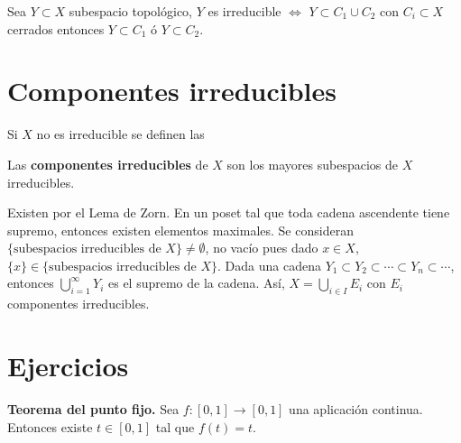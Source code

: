 \begin{ejer}
    Sea $Y\subset X$ subespacio topol\'ogico, $Y$ es irreducible $\iff$ $Y\subset C_1 \cup C_2$ con $C_i \subset X$ cerrados entonces $Y\subset C_1$ \'o $Y \subset C_2$. 
\end{ejer}
\section{Componentes irreducibles}
Si $X$ no es irreducible se definen las 
\begin{defi}
    Las \textbf{componentes irreducibles} de $X$ son los mayores subespacios de $X$ irreducibles. 
\end{defi}
\begin{obs}
    Existen por el Lema de Zorn. En un poset tal que toda cadena ascendente tiene supremo, entonces existen elementos maximales. Se consideran $\{\text{subespacios irreducibles de } X\} \neq \emptyset$, no vac\'io pues dado $x\in X$, $\{x\}\in \{\text{subespacios irreducibles de } X\}$. Dada una cadena $Y_1 \subset Y_2 \subset \cdots \subset Y_n \subset \cdots$, entonces $\bigcup_{i=1}^{\infty} Y_i$ es el supremo de la cadena. As\'i, $X = \bigcup_{i\in I} E_i$ con $E_i$ componentes irreducibles. 
\end{obs}
\section{Ejercicios}\begin{ejer}[139] \textbf{Teorema del punto fijo.} Sea $f \colon [0,1] \to [0,1]$ una aplicación continua. Entonces existe $t \in [0,1]$ tal que $f(t) = t$.
\end{ejer}

